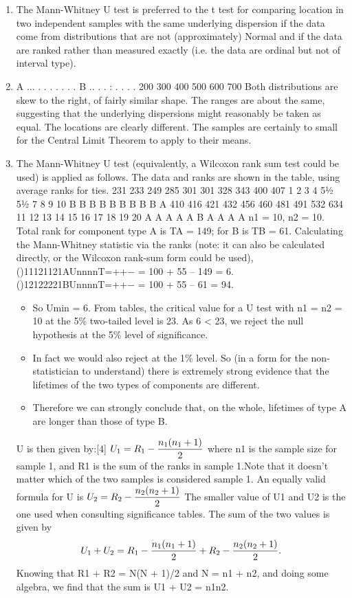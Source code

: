\documentclass[a4paper,12pt]{article}
\begin{document}
\begin{enumerate}
\item The Mann-Whitney U test is preferred to the t test for comparing location in two independent samples with the same underlying dispersion if the data come from distributions that are not (approximately) Normal and if the data are ranked rather than measured exactly (i.e. the data are ordinal but not of interval type).
\item
A
... . . . . .
.
.
B
.. . .
: . .
. .
200 300 400 500 600 700
Both distributions are skew to the right, of fairly similar shape. The ranges are about the same, suggesting that the underlying dispersions might reasonably be taken as equal. The locations are clearly different. The samples are certainly to small for the Central Limit Theorem to apply to their means.
\item The Mann-Whitney U test (equivalently, a Wilcoxon rank sum test could be used) is applied as follows. The data and ranks are shown in the table, using average ranks for ties.
231
233
249
285
301
301
328
343
400
407
1
2
3
4
5½
5½
7
8
9
10
B
B
B
B
B
B
B
B
B
A
410
416
421
432
456
460
481
491
532
634
11
12
13
14
15
16
17
18
19
20
A
A
A
A
A
B
A
A
A
A
n1 = 10, n2 = 10. Total rank for component type A is TA = 149; for B is TB = 61.
Calculating the Mann-Whitney statistic via the ranks (note: it can also be calculated directly, or the Wilcoxon rank-sum form could be used),
()11121121AUnnnnT=++− = 100 + 55 – 149 = 6.
()12122221BUnnnnT=++− = 100 + 55 – 61 = 94.
\begin{itemize}
\item So Umin = 6. From tables, the critical value for a U test with n1 = n2 = 10 at the 5\% two-tailed level is 23. As 6 < 23, we reject the null hypothesis at the 5\% level of significance.
\item In fact we would also reject at the 1\% level. So (in a form for the non-statistician to understand) there is extremely strong evidence that the lifetimes of the two types of components are different. 
\item Therefore we can strongly conclude that, on the whole, lifetimes of type A are longer than those of type B.
\end{itemize}

\begin{framed}

U is then given by:[4]
$ {\displaystyle U_{1}=R_{1}-{n_{1}(n_{1}+1) \over 2}\,\!}  $ 
where n1 is the sample size for sample 1, and R1 is the sum of the ranks in sample 1.Note that it doesn't matter which of the two samples is considered sample 1. An equally valid formula for U is
${\displaystyle U_{2}=R_{2}-{n_{2}(n_{2}+1) \over 2}\,\!} $
The smaller value of U1 and U2 is the one used when consulting significance tables. The sum of the two values is given by \[ {\displaystyle U_{1}+U_{2}=R_{1}-{n_{1}(n_{1}+1) \over 2}+R_{2}-{n_{2}(n_{2}+1) \over 2}.\,\!}\] 
Knowing that R1 + R2 = N(N + 1)/2 and N = n1 + n2, and doing some algebra, we find that the sum is U1 + U2 = n1n2.
\end{framed}
\end{enumerate}
\end{document}
